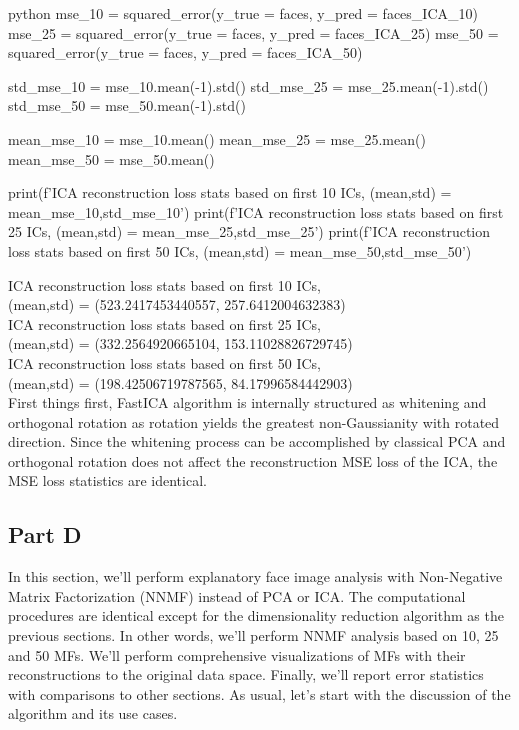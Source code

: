 \documentclass[12pt]{amsart}
\begin{document}
\begin{mintedbox}{python}
mse_10 = squared_error(y_true = faces, y_pred = faces_ICA_10)
mse_25 = squared_error(y_true = faces, y_pred = faces_ICA_25)
mse_50 = squared_error(y_true = faces, y_pred = faces_ICA_50)


std_mse_10 = mse_10.mean(-1).std()
std_mse_25 = mse_25.mean(-1).std()
std_mse_50 = mse_50.mean(-1).std()

mean_mse_10 = mse_10.mean()
mean_mse_25 = mse_25.mean()
mean_mse_50 = mse_50.mean()


print(f'ICA reconstruction loss stats based on first 10 ICs, \n (mean,std) = {mean_mse_10,std_mse_10}')
print(f'ICA reconstruction loss stats based on first 25 ICs, \n (mean,std) = {mean_mse_25,std_mse_25}')
print(f'ICA reconstruction loss stats based on first 50 ICs, \n (mean,std) = {mean_mse_50,std_mse_50}')
\end{mintedbox}

ICA reconstruction loss stats based on first 10 ICs,  \\
 (mean,std) = (523.2417453440557, 257.6412004632383)\\
ICA reconstruction loss stats based on first 25 ICs, \\
 (mean,std) = (332.2564920665104, 153.11028826729745)\\
ICA reconstruction loss stats based on first 50 ICs, \\
 (mean,std) = (198.42506719787565, 84.17996584442903)\\

First things first, FastICA algorithm is internally structured as whitening and orthogonal rotation as rotation yields the greatest non-Gaussianity with rotated direction. Since the whitening process can be accomplished by classical PCA and orthogonal rotation does not affect the reconstruction MSE loss of the ICA, the MSE loss statistics are identical.

\subsection{Part D}
In this section, we'll perform explanatory face image analysis with Non-Negative Matrix Factorization (NNMF) instead of PCA or ICA. The computational procedures are identical except for the dimensionality reduction algorithm as the previous sections. In other words, we'll perform NNMF analysis based on 10, 25 and 50 MFs. We'll perform comprehensive visualizations of MFs with their reconstructions to the original data space. Finally, we'll report error statistics with comparisons to other sections. As usual, let's start with the discussion of the algorithm and its use cases.
\end{document}
